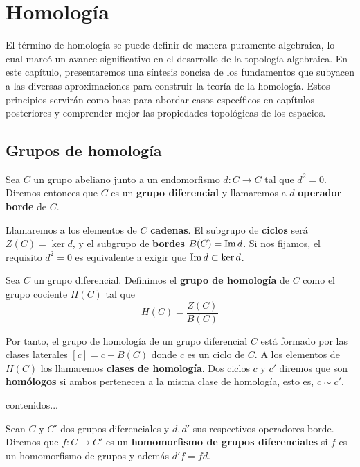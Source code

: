 
\chapter{Homología}

El término de homología se puede definir de manera puramente algebraica, lo cual marcó un avance significativo en el desarrollo de la topología algebraica. En este capítulo, presentaremos una síntesis concisa de los fundamentos que subyacen a las diversas aproximaciones para construir la teoría de la homología. Estos principios servirán como base para abordar casos específicos en capítulos posteriores y comprender mejor las propiedades topológicas de los espacios.

\section{Grupos de homología}

\begin{definicion}
	Sea $C$ un grupo abeliano junto a un endomorfismo  $d: C \rightarrow C$ tal que $d^2 = 0$. Diremos entonces que $C$ es un \textbf{grupo diferencial} y llamaremos a $d$ \textbf{operador borde} de $C$.
\end{definicion}

Llamaremos a los elementos de $C$ \textbf{cadenas}. El subgrupo de \textbf{ciclos} será $Z(C) = \ker d$,  y el subgrupo de \textbf{bordes} $B(C) = \operatorname{Im} d$. Si nos fijamos, el requisito $d^2 = 0$ es equivalente a exigir que $\operatorname{Im}{d} \subset \ker{d}$.

\begin{definicion}
	Sea $C$ un grupo diferencial. Definimos el \textbf{grupo de homología} de $C$ como el grupo cociente $H(C)$ tal que 
	\[ H(C) = \frac{Z(C)}{B(C)}\]
\end{definicion}

Por tanto, el grupo de homología de un grupo diferencial $C$ está formado por las clases laterales $[c] = c + B(C)$ donde $c$ es un ciclo de $C$. A los elementos de $H(C)$ los llamaremos \textbf{clases de homología}. Dos ciclos $c$ y $c'$ diremos que son \textbf{homólogos} si ambos pertenecen a la misma clase de homología, esto es, $c \sim c'$.

\begin{ejemplo}
	contenidos...
\end{ejemplo}

\begin{definicion}
	Sean $C$ y $C'$ dos grupos diferenciales y $d, d'$ sus respectivos operadores borde. Diremos que $f: C \rightarrow C'$ es un \textbf{homomorfismo de grupos diferenciales} si $f$ es un homomorfismo de grupos y además $d'f = fd$.
\end{definicion}

